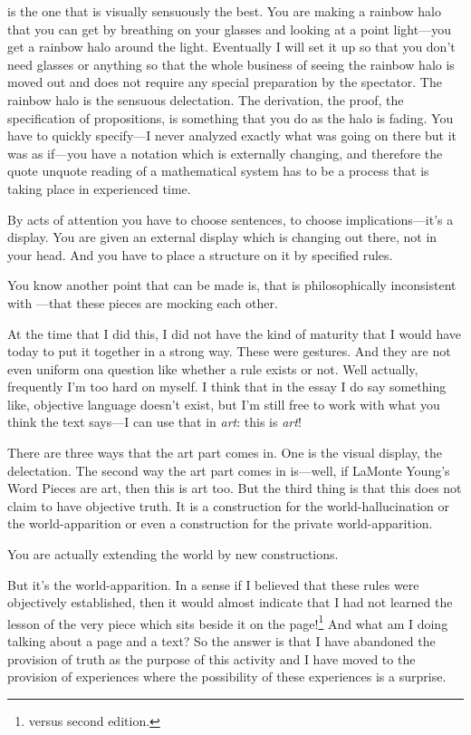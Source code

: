  is the one that is visually sensuously the best. You are 
making a rainbow halo that you can get by breathing on your glasses 
and looking at a point light---you get a rainbow halo around the light. 
Eventually I will set it up so that you don't need glasses or anything so 
that the whole business of seeing the rainbow halo is moved out and 
does not require any special preparation by the spectator. The rainbow 
halo is the sensuous delectation. The derivation, the proof, the 
specification of propositions, is something that you do as the halo is fading. 
You have to quickly specify---I never analyzed exactly what was going 
on there but it was as if---you have a notation which is externally 
changing, and therefore the quote unquote reading of a mathematical 
system has to be a process that is taking place in experienced time. 

By acts of attention you have to choose sentences, to choose 
implications---it's a display. You are given an external display which is 
changing out there, not in your head. And you have to place a structure 
on it by specified rules. 

You know another point that can be made is, that  is 
philosophically inconsistent with ---that these pieces 
are mocking each other. 

At the time that I did this, I did not have the kind of maturity that I 
would have today to put it together in a strong way. These were 
gestures. And they are not even uniform ona question like whether a 
rule exists or not. Well actually, frequently I'm too hard on myself. I 
think that in the essay  I do say something like, objective 
language doesn't exist, but I'm still free to work with what you think the 
text says---I can use that in \emph{art}: this is \emph{art}! 

There are three ways that the art part comes in. One is the visual 
display, the delectation. The second way the art part comes in is---well, 
if LaMonte Young's Word Pieces are art, then this is art too. But the 
third thing is that this does not claim to have objective truth. It is a 
construction for the world-hallucination or the world-apparition or 
even a construction for the private world-apparition. 

 You are actually extending the world by new constructions. 

 But it's the world-apparition. In a sense if I believed that these 
rules were objectively established, then it would almost indicate that I 
had not learned the lesson of the very piece which sits beside it on the 
page!\footnote{ versus  second edition.}
And what am I doing talking about a page and a text? So the 
answer is that I have abandoned the provision of truth as the purpose of 
this activity and I have moved to the provision of experiences where the 
possibility of these experiences is a surprise. 

